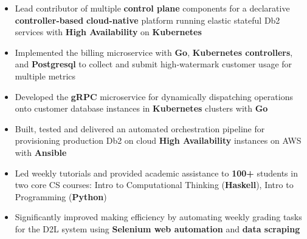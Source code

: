 \documentclass[10pt,a4paper]{altacv}
\begin{document}
 \begin{itemize} 
  \item Lead contributor of multiple \textbf{control plane} components for a declarative \textbf{controller-based} \textbf{cloud-native} platform running elastic stateful Db2 services with \textbf{High Availability} on\textbf{ Kubernetes}
  \item Implemented the billing microservice with \textbf{Go}, \textbf{Kubernetes controllers}, and \textbf{Postgresql} to collect and submit high-watermark customer usage for multiple metrics
  \item Developed the \textbf{gRPC} microservice for dynamically dispatching operations onto customer database instances in \textbf{Kubernetes} clusters with \textbf{Go} \\
 \item Built, tested and delivered an automated orchestration pipeline for provisioning production Db2 on cloud \textbf{High Availability} instances on AWS with \textbf{Ansible} \\
  
 \end{itemize}
 
 \divider
 
 \begin{itemize} 
 \item Led weekly tutorials and provided academic assistance to \textbf{100+} students in two core CS courses: Intro to Computational Thinking (\textbf{Haskell}), Intro to Programming (\textbf{Python})
 \item Significantly improved making efficiency by automating weekly grading tasks for the D2L system using 
\textbf{Selenium web automation} and \textbf{data scraping}
 
 
 \end{itemize}
\divider
\end{document}
